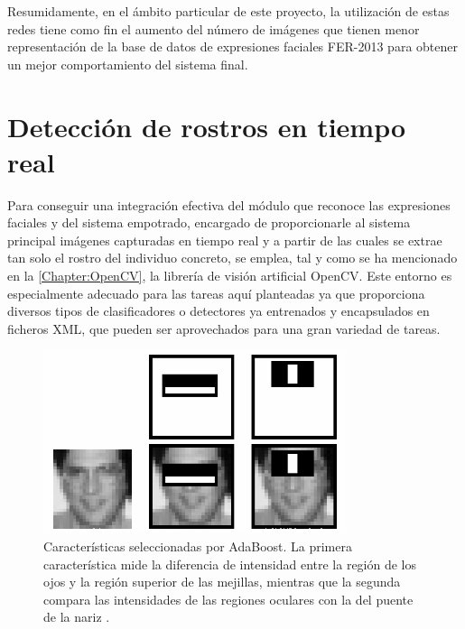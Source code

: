 Resumidamente, en el ámbito particular de este proyecto, la utilización de estas redes tiene como fin el aumento del número de imágenes que tienen menor representación de la base de datos de expresiones faciales FER-2013 para obtener un mejor comportamiento del sistema final.

\section{Detección de rostros en tiempo real} \label{Chapter:FaceDetection}

Para conseguir una integración efectiva del módulo que reconoce las expresiones faciales y del sistema empotrado, encargado de proporcionarle al sistema principal imágenes capturadas en tiempo real y a partir de las cuales se extrae tan solo el rostro del individuo concreto, se emplea, tal y como se ha mencionado en la \autoref{Chapter:OpenCV}, la librería de visión artificial OpenCV. Este entorno es especialmente adecuado para las tareas aquí planteadas ya que proporciona diversos tipos de clasificadores o detectores ya entrenados y encapsulados en ficheros XML, que pueden ser aprovechados para una gran variedad de tareas.

\begin{figure}
    \centering
    \includegraphics[scale=0.75]{Images/Haar.png}
    \caption{Características seleccionadas por AdaBoost. La primera característica mide la diferencia de intensidad entre la región de los ojos y la región superior de las mejillas, mientras que la segunda compara las intensidades de las regiones oculares con la del puente de la nariz \cite{Viola}.}
    \label{fig:Haar}
\end{figure}

